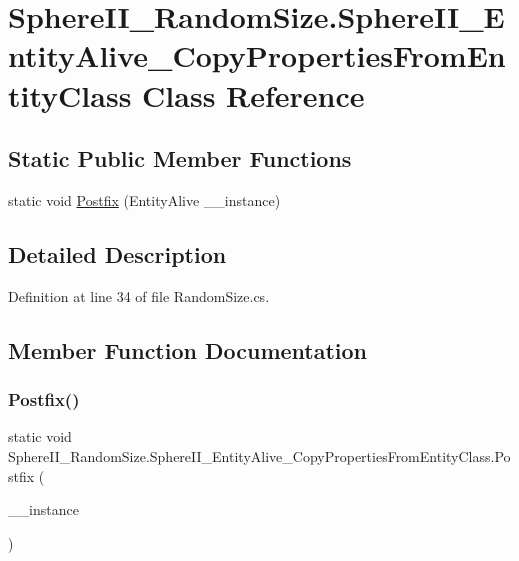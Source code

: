 \hypertarget{class_sphere_i_i___random_size_1_1_sphere_i_i___entity_alive___copy_properties_from_entity_class}{}\section{Sphere\+I\+I\+\_\+\+Random\+Size.\+Sphere\+I\+I\+\_\+\+Entity\+Alive\+\_\+\+Copy\+Properties\+From\+Entity\+Class Class Reference}
\label{class_sphere_i_i___random_size_1_1_sphere_i_i___entity_alive___copy_properties_from_entity_class}
\subsection*{Static Public Member Functions}
\begin{DoxyCompactItemize}
\item 
static void \mbox{\hyperlink{class_sphere_i_i___random_size_1_1_sphere_i_i___entity_alive___copy_properties_from_entity_class_a6b8b4554c23525d483efc44741715512}{Postfix}} (Entity\+Alive \+\_\+\+\_\+instance)
\end{DoxyCompactItemize}


\subsection{Detailed Description}


Definition at line 34 of file Random\+Size.\+cs.



\subsection{Member Function Documentation}
\mbox{\label{class_sphere_i_i___random_size_1_1_sphere_i_i___entity_alive___copy_properties_from_entity_class_a6b8b4554c23525d483efc44741715512}} 
\subsubsection{\texorpdfstring{Postfix()}{Postfix()}}
{\footnotesize\ttfamily static void Sphere\+I\+I\+\_\+\+Random\+Size.\+Sphere\+I\+I\+\_\+\+Entity\+Alive\+\_\+\+Copy\+Properties\+From\+Entity\+Class.\+Postfix (\begin{DoxyParamCaption}\item[{Entity\+Alive}]{\+\_\+\+\_\+instance }\end{DoxyParamCaption})\hspace{0.3cm}{\ttfamily [static]}}



